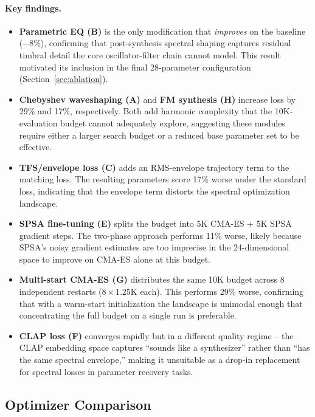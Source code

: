 \paragraph{Key findings.}
\begin{itemize}
  \item \textbf{Parametric EQ (B)} is the only modification that \emph{improves} on the baseline ($-8\%$), confirming that post-synthesis spectral shaping captures residual timbral detail the core oscillator-filter chain cannot model. This result motivated its inclusion in the final 28-parameter configuration (Section~\ref{sec:ablation}).
  \item \textbf{Chebyshev waveshaping (A)} and \textbf{FM synthesis (H)} increase loss by 29\% and 17\%, respectively. Both add harmonic complexity that the 10K-evaluation budget cannot adequately explore, suggesting these modules require either a larger search budget or a reduced base parameter set to be effective.
  \item \textbf{TFS/envelope loss (C)} adds an RMS-envelope trajectory term to the matching loss. The resulting parameters score 17\% worse under the standard loss, indicating that the envelope term distorts the spectral optimization landscape.
  \item \textbf{SPSA fine-tuning (E)} splits the budget into 5K CMA-ES + 5K SPSA gradient steps. The two-phase approach performs 11\% worse, likely because SPSA's noisy gradient estimates are too imprecise in the 24-dimensional space to improve on CMA-ES alone at this budget.
  \item \textbf{Multi-start CMA-ES (G)} distributes the same 10K budget across 8 independent restarts ($8 \times 1.25$K each). This performs 29\% worse, confirming that with a warm-start initialization the landscape is unimodal enough that concentrating the full budget on a single run is preferable.
  \item \textbf{CLAP loss (F)} converges rapidly but in a different quality regime -- the CLAP embedding space captures ``sounds like a synthesizer'' rather than ``has the same spectral envelope,'' making it unsuitable as a drop-in replacement for spectral losses in parameter recovery tasks.
\end{itemize}

\subsection{Optimizer Comparison}
\label{sec:optimizer-comparison}

